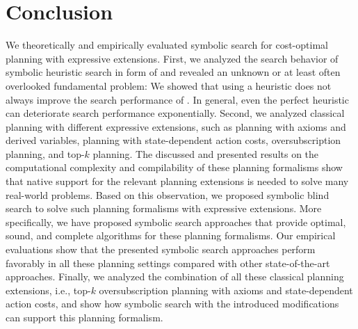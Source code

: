 \chapter{Conclusion}\label{ch:conclusion}

We theoretically and empirically evaluated symbolic search for cost-optimal planning with expressive extensions. 
%
First, we analyzed the search behavior of symbolic heuristic search in form of \bddastar{} and revealed an unknown or at least often overlooked fundamental problem: We showed that using a heuristic does not always improve the search performance of \bddastar{}.
In general, even the perfect heuristic can deteriorate search performance exponentially.
%
Second, we analyzed classical planning with different expressive extensions, such as planning with axioms and derived variables, planning with state-dependent action costs, oversubscription planning, and top-$k$ planning.
The discussed and presented results on the computational complexity and compilability of these planning formalisms show that native support for the relevant planning extensions is needed to solve many real-world problems.
Based on this observation, we proposed symbolic blind search to solve such planning formalisms with expressive extensions. 
More specifically, we have proposed symbolic search approaches that provide optimal, sound, and complete algorithms for these planning formalisms. 
Our empirical evaluations show that the presented symbolic search approaches perform favorably in all these planning settings compared with other state-of-the-art approaches. 
Finally, we analyzed the combination of all these classical planning extensions, i.e., top-$k$ oversubscription planning with axioms and state-dependent action costs, and show how symbolic search with the introduced modifications can support this planning formalism.